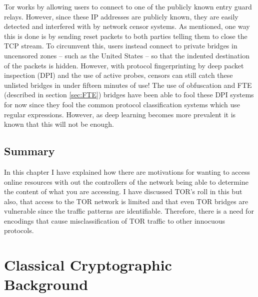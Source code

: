 \documentclass[ %
                    author={Samuel Russell},
                supervisor={Prof. Bogdan Warinschi},
                    degree={MEng},
                     title={Innocuous Ciphertexts},
                  subtitle={The DE-CENSOR Scheme},
                      type={research},
                      year={2018} ]{dissertation}
\begin{document}
Tor works by allowing users to connect to one of the publicly known entry guard relays. However, since these IP addresses are publicly known, they are easily detected and interfered with by network censor systems. As mentioned, one way this is done is by sending reset packets to both parties telling them to close the TCP stream.
To circumvent this, users instead connect to private bridges in uncensored zones -- such as the United States -- so that the indented destination of the packets is hidden. However, with protocol fingerprinting by deep packet inspection (DPI) and the use of active probes, censors can still catch these unlisted bridges in under fifteen minutes of use!
The use of obfuscation and FTE (described in section \ref{sec:FTE}) bridges have been able to fool these DPI systems for now since they fool the common protocol classification systems which use regular expressions. However, as deep learning becomes more prevalent it is known that this will not be enough.

\section{Summary}

In this chapter I have explained how there are motivations for wanting to access online resources  with out the controllers of the network being able to determine the content of what you are accessing. I have discussed TOR's roll in this but also, that access to the TOR network is limited and that even TOR bridges are vulnerable since the traffic patterns are identifiable. Therefore, there is a need for encodings that cause misclassification of TOR traffic to other innocuous protocols. 


\chapter{Classical Cryptographic Background}
\label{chap:technical}
\end{document}
